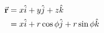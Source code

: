 \begin{equation}
  \begin{aligned}
    \va{r} &= x\hat{i} + y\hat{j} + z\hat{k} \\
        &= x\hat{i} + r\cos\phi\hat{j} + r\sin\phi\hat{k}
  \end{aligned}
\end{equation}

